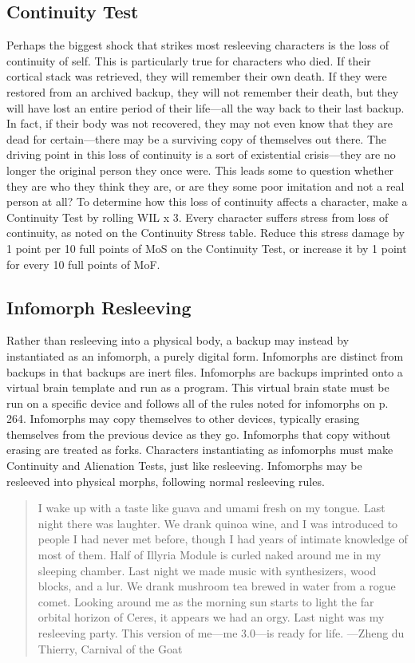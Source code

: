\subsection{Continuity Test} 

Perhaps the biggest shock that strikes most resleeving characters is the loss of continuity of self. This is particularly true for characters who died. If their cortical stack was retrieved, they will remember their own death. If they were restored from an archived backup, they will not remember their death, but they will have lost an entire period of their life—all the way back to their last backup. In fact, if their body was not recovered, they may not even know that they are dead for certain—there may be a surviving copy of themselves out there. The driving point in this loss of continuity is a sort of existential crisis—they are no longer the original person they once were. This leads some to question whether they are who they think they are, or are they some poor imitation and not a real person at all? To determine how this loss of continuity affects a character, make a Continuity Test by rolling WIL x 3. Every character suffers stress from loss of continuity, as noted on the Continuity Stress table. Reduce this stress damage by 1 point per 10 full points of MoS on the Continuity Test, or increase it by 1 point for every 10 full points of MoF. 

\subsection{Infomorph Resleeving} 

Rather than resleeving into a physical body, a backup may instead by instantiated as an infomorph, a purely digital form. Infomorphs are distinct from backups in that backups are inert files. Infomorphs are backups imprinted onto a virtual brain template and run as a program. This virtual brain state must be run on a specific device and follows all of the rules noted for infomorphs on p. 264. Infomorphs may copy themselves to other devices, typically erasing themselves from the previous device as they go. Infomorphs that copy without erasing are treated as forks. Characters instantiating as infomorphs must make Continuity and Alienation Tests, just like resleeving. Infomorphs may be resleeved into physical morphs, following normal resleeving rules. 



\begin{quotation} I wake up with a taste like guava and umami fresh on my tongue. Last night there was laughter. We drank quinoa wine, and I was introduced to people I had never met before, though I had years of intimate knowledge of most of them. Half of Illyria Module is curled naked around me in my sleeping chamber. Last night we made music with synthesizers, wood blocks, and a lur. We drank mushroom tea brewed in water from a rogue comet. Looking around me as the morning sun starts to light the far orbital horizon of Ceres, it appears we had an orgy. Last night was my resleeving party. This version of me—me 3.0—is ready for life. —Zheng du Thierry, Carnival of the Goat \end{quotation} 



